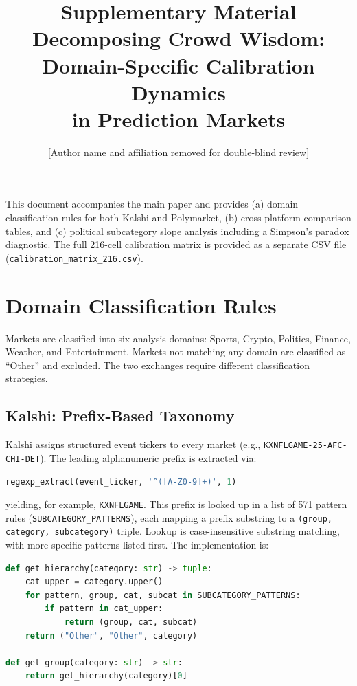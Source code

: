 \documentclass[11pt,a4paper]{article}
\title{\textbf{Supplementary Material}\\[6pt]
\large Decomposing Crowd Wisdom: Domain-Specific Calibration Dynamics\\in Prediction Markets}
\author{[Author name and affiliation removed for double-blind review]}
\date{}
\begin{document}
\maketitle

\noindent This document accompanies the main paper and provides (a) domain classification rules for both Kalshi and Polymarket, (b) cross-platform comparison tables, and (c) political subcategory slope analysis including a Simpson's paradox diagnostic. The full 216-cell calibration matrix is provided as a separate CSV file (\texttt{calibration\_matrix\_216.csv}).

\tableofcontents
\vspace{1em}

\section{Domain Classification Rules}\label{sec:classification}

Markets are classified into six analysis domains: Sports, Crypto, Politics, Finance, Weather, and Entertainment. Markets not matching any domain are classified as ``Other'' and excluded. The two exchanges require different classification strategies.

\subsection{Kalshi: Prefix-Based Taxonomy}\label{sec:kalshi_class}

Kalshi assigns structured event tickers to every market (e.g., \texttt{KXNFLGAME-25-AFC-CHI-DET}). The leading alphanumeric prefix is extracted via:

\begin{lstlisting}[language=SQL]
regexp_extract(event_ticker, '^([A-Z0-9]+)', 1)
\end{lstlisting}

\noindent yielding, for example, \texttt{KXNFLGAME}. This prefix is looked up in a list of 571 pattern rules (\texttt{SUBCATEGORY\allowbreak\_PATTERNS}), each mapping a prefix substring to a \texttt{(group, category, subcategory)} triple. Lookup is case-insensitive substring matching, with more specific patterns listed first. The implementation is:

\begin{lstlisting}[language=Python]
def get_hierarchy(category: str) -> tuple:
    cat_upper = category.upper()
    for pattern, group, cat, subcat in SUBCATEGORY_PATTERNS:
        if pattern in cat_upper:
            return (group, cat, subcat)
    return ("Other", "Other", category)

def get_group(category: str) -> str:
    return get_hierarchy(category)[0]
\end{lstlisting}
\end{document}

